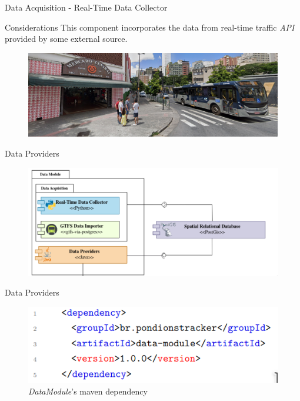 \documentclass[xcolor=dvipsnames,table]{beamer}
\begin{document}
\begin{frame}{Data Acquisition - Real-Time Data Collector}
        \begin{block}{Considerations}
                This component incorporates the data 
                from real-time traffic \textit{API} provided by some external source.
        \end{block}
        \begin{figure}[H]
                \centering
                \includegraphics[width=\textwidth]{images/entry_mercado.png}
        \end{figure}
\end{frame}
\begin{frame}{Data Providers}
        \begin{figure}[H]
                \centering
                \includegraphics[width=\textwidth]{images/datamodule.png}
        \end{figure}
\end{frame}

\begin{frame}{Data Providers}
        \begin{figure}[H]
                \centering
                \includegraphics[scale=0.45]{images/mddatamodule.png}
                \caption{\textit{DataModule}'s maven dependency}
        \end{figure}
\end{frame}
\end{document}
